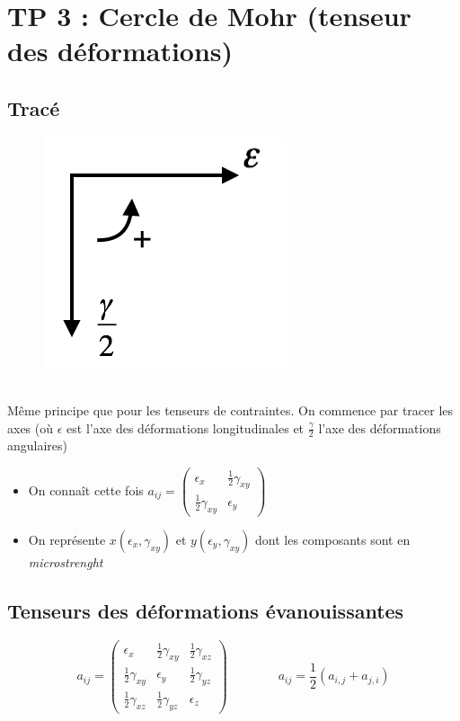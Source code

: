 \section*{TP 3 : Cercle de Mohr (tenseur des déformations)}
\subsection*{Tracé}

\begin{figure}
	\includegraphics[scale=0.5]{TP3-1}
\end{figure}	
\ \\ Même principe que pour les tenseurs de contraintes. On commence par tracer les axes (où $\epsilon$ est l'axe des déformations longitudinales et $\frac{\gamma}{2}$ l'axe des déformations angulaires)

\begin{itemize}	
	\item On connaît cette fois $a_{ij} = 
	      \left(	
	      \begin{array}{cc}
	      	\epsilon _x             & \frac{1}{2}\gamma _{xy} \\ 
	      	\frac{1}{2}\gamma _{xy} & \epsilon _y             
	      \end{array}
	      \right) $
	      	
	\item On représente $x(\epsilon _x,\gamma _{xy})$ et $y(\epsilon _y ,\gamma _{xy})$ dont les composants sont en \textit{microstrenght}
\end{itemize}

\subsection*{Tenseurs des déformations évanouissantes}
\begin{equation}
	a_ {ij} = 
	\left(
	\begin{array}{ccc}
		\epsilon _x             & \frac{1}{2}\gamma _{xy} & \frac{1}{2}\gamma _{xz} \\ 
		\frac{1}{2}\gamma _{xy} & \epsilon _y             & \frac{1}{2}\gamma _{yz} \\ 
		\frac{1}{2}\gamma _{xz} & \frac{1}{2}\gamma _{yz} & \epsilon _z             
	\end{array} 
	\right)
	\qquad \qquad
	a_{ij} = \frac{1}{2}(a_{i,j} + a_{j,i})
\end{equation}

